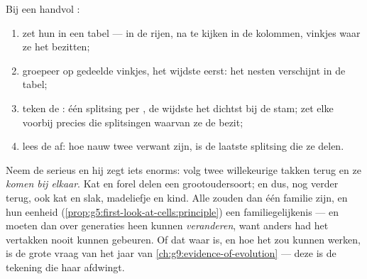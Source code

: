 \begin{method}\label{met:g6:classification-kinship:build}
Bij een handvol :
\begin{enumerate}
  \item zet hun  in een tabel ---  in de rijen, na te
        kijken  in de kolommen, vinkjes waar ze het bezitten;
  \item groepeer op gedeelde vinkjes, het wijdste  eerst: het
        nesten verschijnt in de tabel;
  \item teken de : één splitsing per , de wijdste het
        dichtst bij de stam; zet elke  voorbij precies die
        splitsingen waarvan ze de  bezit;
  \item lees de  af: hoe nauw twee  verwant zijn, is
        de laatste splitsing die ze delen.
\end{enumerate}
\end{method}

\begin{remark}\label{rem:g6:classification-kinship:implies}
Neem de  serieus en hij zegt iets enorms: volg twee willekeurige
takken terug en ze \emph{komen bij elkaar}. Kat en forel delen een
grootoudersoort; en dus, nog verder terug, ook kat en slak, madeliefje en
kind. Alle  zouden dan één familie zijn, en hun eenheid
(\cref{prop:g5:first-look-at-cells:principle}) een familiegelijkenis ---
en  moeten dan over generaties heen kunnen \emph{veranderen}, want
anders had het vertakken nooit kunnen gebeuren. Of dat waar is, en hoe
het zou kunnen werken, is de grote vraag van het jaar van
\cref{ch:g9:evidence-of-evolution} --- deze  is de tekening die
haar afdwingt.
\end{remark}

